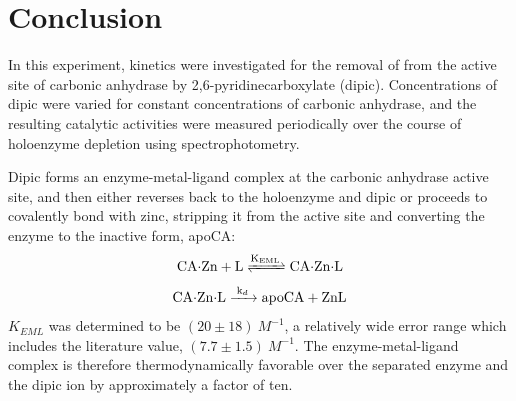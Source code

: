 \section{Conclusion}
In this experiment, kinetics were investigated for the removal of  from the active site of carbonic anhydrase by 2,6-pyridinecarboxylate (dipic). Concentrations of dipic were varied for constant concentrations of carbonic anhydrase, and the resulting catalytic activities were measured periodically over the course of holoenzyme depletion using spectrophotometry.

Dipic forms an enzyme-metal-ligand complex at the carbonic anhydrase active site, and then either reverses back to the holoenzyme and dipic or proceeds to covalently bond with zinc, stripping it from the active site and converting the enzyme to the inactive form, apoCA:
\begin{align}
\ce{CA$\cdot$Zn + L
<=>[\ce{K_{EML}}]
CA$\cdot$Zn$\cdot$L}
\end{align}
\begin{align}\label{eqn:kd_reaction}
\ce{CA$\cdot$Zn$\cdot$L
->[\ce{k_{d}}]
apoCA + ZnL}
\end{align}
$K_{EML}$ was determined to be $(20\pm{18}){\ }M^{-1}$, a relatively wide error range which includes the literature value, $(7.7\pm{1.5}){\ }M^{-1}$\cite{bib:easy_peasy_values}. The enzyme-metal-ligand complex is therefore thermodynamically favorable over the separated enzyme and the dipic ion by approximately a factor of ten.

